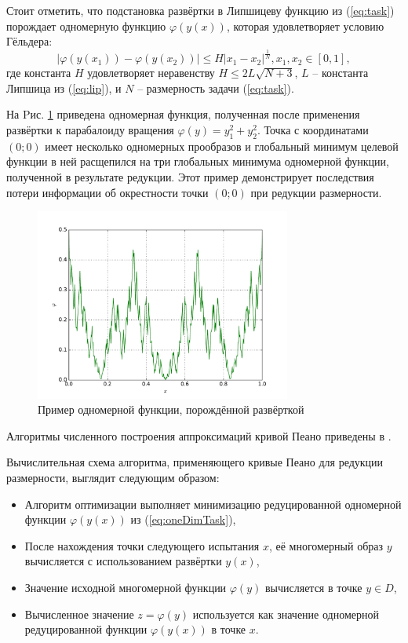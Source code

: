 Стоит отметить, что подстановка развёртки в Липшицеву функцию  %
из (\ref{eq:task}) порождает одномерную функцию \(\varphi(y(x))\), которая удовлетворяет условию Гёльдера:
\begin{equation}
\label{eq:holder}
|\varphi(y(x_1))-\varphi(y(x_2))|\leq H{|x_1-x_2|}^{\frac{1}{N}}, x_1,x_2\in[0,1],
\end{equation}
где константа $H$ удовлетворяет неравенству \(H\leqslant2L\sqrt{N+3}\), \(L\) -- константа Липшица из (\ref{eq:lip}),
и \(N\) -- размерность задачи (\ref{eq:task}).

На Pис. \ref{fig:evolvent_example} приведена одномерная функция, полученная после применения развёртки к
парабалоиду вращения \(\varphi(y)=y_1^2+y_2^2\). Точка с координатами \((0;0)\) имеет несколько одномерных прообразов
и глобальный минимум целевой функции в ней расщепился на три глобальных минимума одномерной функции, полученной в результате
редукции. Этот пример демонстрирует последствия потери информации об окрестности точки \((0;0)\) при редукции размерности.

\begin{figure}[ht]
    \center
    \includegraphics[width=0.75\textwidth]{images/map_paraboloid.pdf}
    \caption{Пример одномерной функции, порождённой развёрткой}
    \label{fig:evolvent_example}
\end{figure}

Алгоритмы численного построения аппроксимаций кривой Пеано приведены в \cite{Strongin2000}.

Вычислительная схема алгоритма, применяющего кривые Пеано для редукции размерности, выглядит следующим образом:
\begin{itemize}
  \item Алгоритм оптимизации выполняет минимизацию редуцированной одномерной функции
  \(\varphi(y(x))\) из (\ref{eq:oneDimTask}),
  \item После нахождения точки следующего испытания \(x\), её многомерный образ \(y\)
  вычисляется с использованием развёртки \(y(x)\),
  \item Значение исходной многомерной функции \(\varphi(y)\) вычисляется в точке \(y\in D\),
  \item Вычисленное значение \(z=\varphi(y)\) используется как значение одномерной редуцированной функции \(\varphi(y(x))\) в точке \(x\).
\end{itemize}

